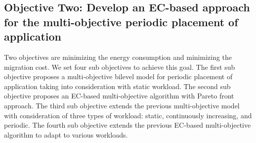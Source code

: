 \subsection{Objective Two: Develop an EC-based approach for the multi-objective periodic placement of application}
 Two objectives are minimizing the energy consumption and minimizing the migration cost.
We set four sub objectives to achieve this goal. The first sub objective proposes a multi-objective bilevel model for periodic placement of application taking into consideration with static workload. The second sub objective proposes an EC-based multi-objective algorithm with Pareto front approach. The third sub objective extends the previous multi-objective model with consideration of three types of workload: static, continuously increasing, and periodic. The fourth sub objective extends the previous EC-based multi-objective algorithm to adapt to various workloads.


